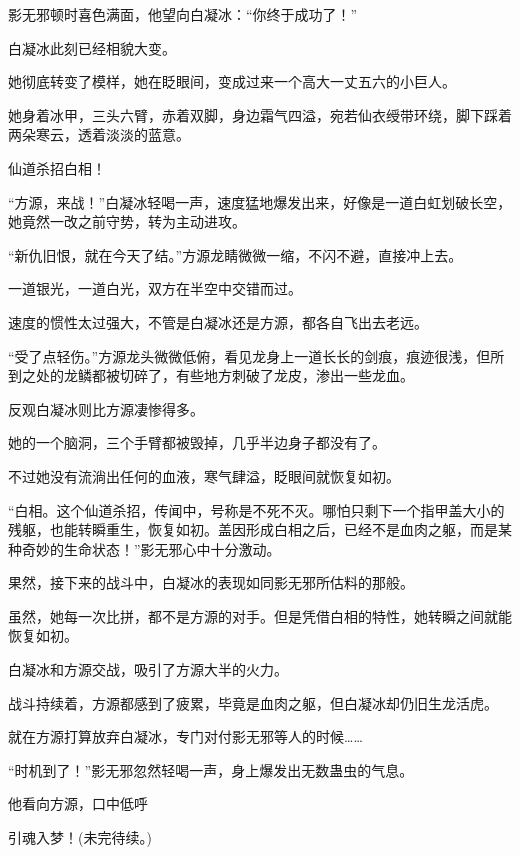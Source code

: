 \begin{this_body}
影无邪顿时喜色满面，他望向白凝冰：“你终于成功了！”

白凝冰此刻已经相貌大变。

她彻底转变了模样，她在眨眼间，变成过来一个高大一丈五六的小巨人。

她身着冰甲，三头六臂，赤着双脚，身边霜气四溢，宛若仙衣绶带环绕，脚下踩着两朵寒云，透着淡淡的蓝意。

仙道杀招白相！

“方源，来战！”白凝冰轻喝一声，速度猛地爆发出来，好像是一道白虹划破长空，她竟然一改之前守势，转为主动进攻。

“新仇旧恨，就在今天了结。”方源龙睛微微一缩，不闪不避，直接冲上去。

一道银光，一道白光，双方在半空中交错而过。

速度的惯性太过强大，不管是白凝冰还是方源，都各自飞出去老远。

“受了点轻伤。”方源龙头微微低俯，看见龙身上一道长长的剑痕，痕迹很浅，但所到之处的龙鳞都被切碎了，有些地方刺破了龙皮，渗出一些龙血。

反观白凝冰则比方源凄惨得多。

她的一个脑洞，三个手臂都被毁掉，几乎半边身子都没有了。

不过她没有流淌出任何的血液，寒气肆溢，眨眼间就恢复如初。

“白相。这个仙道杀招，传闻中，号称是不死不灭。哪怕只剩下一个指甲盖大小的残躯，也能转瞬重生，恢复如初。盖因形成白相之后，已经不是血肉之躯，而是某种奇妙的生命状态！”影无邪心中十分激动。

果然，接下来的战斗中，白凝冰的表现如同影无邪所估料的那般。

虽然，她每一次比拼，都不是方源的对手。但是凭借白相的特性，她转瞬之间就能恢复如初。

白凝冰和方源交战，吸引了方源大半的火力。

战斗持续着，方源都感到了疲累，毕竟是血肉之躯，但白凝冰却仍旧生龙活虎。

就在方源打算放弃白凝冰，专门对付影无邪等人的时候……

“时机到了！”影无邪忽然轻喝一声，身上爆发出无数蛊虫的气息。

他看向方源，口中低呼

引魂入梦！(未完待续。)

\end{this_body}

